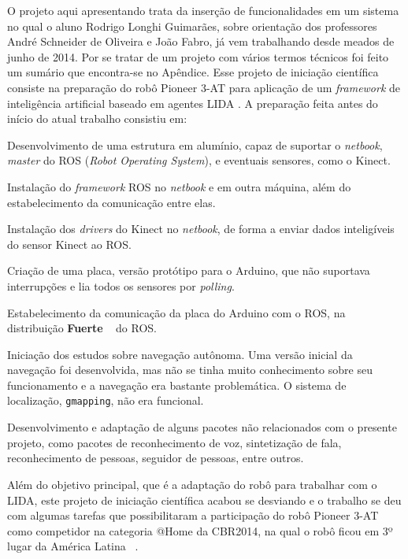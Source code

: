 
O projeto aqui apresentando trata da inserção de funcionalidades em um sistema no qual o aluno Rodrigo Longhi Guimarães, sobre orientação dos professores André Schneider de Oliveira e João Fabro, já vem trabalhando desde meados de junho de 2014. Por se tratar de um projeto com vários termos técnicos foi feito um sumário que encontra-se no Apêndice. Esse projeto de iniciação científica consiste na preparação do robô Pioneer 3-AT para aplicação de um \textit{framework} de inteligência artificial baseado em agentes LIDA \cite{LIDA}. A preparação feita antes do início do atual trabalho consistiu em:

\begin{compactitem}
\item Desenvolvimento de uma estrutura em alumínio, capaz de suportar o \textit{netbook}, \textit{master} do ROS (\textit{Robot Operating System}), e eventuais sensores, como o Kinect.
\item Instalação do \textit{framework} ROS no \textit{netbook} e em outra máquina, além do estabelecimento da comunicação entre elas.
\item Instalação dos \textit{drivers} do Kinect no \textit{netbook}, de forma a enviar dados inteligíveis do sensor Kinect ao ROS.
\item Criação de uma placa, versão protótipo para o Arduino, que não suportava interrupções e lia todos os sensores por \textit{polling}.
\item Estabelecimento da comunicação da placa do Arduino com o ROS, na distribuição \textbf{Fuerte} ~\cite{rosFuerte} do ROS.
\item Iniciação dos estudos sobre navegação autônoma. Uma versão inicial da navegação foi desenvolvida, mas não se tinha muito conhecimento sobre seu funcionamento e a navegação era bastante problemática. O sistema de localização, \verb|gmapping|, não era funcional.
\item Desenvolvimento e adaptação de alguns pacotes não relacionados com o presente projeto, como pacotes de reconhecimento de voz, sintetização de fala, reconhecimento de pessoas, seguidor de pessoas, entre outros.
\end{compactitem}

Além do objetivo principal, que é a adaptação do robô para trabalhar com o LIDA, este projeto de iniciação científica acabou se desviando e o trabalho se deu com algumas tarefas que possibilitaram a participação do robô Pioneer 3-AT como competidor na categoria @Home da CBR2014, na qual o robô ficou em 3º lugar da América Latina ~\cite{cbr2014}. 

